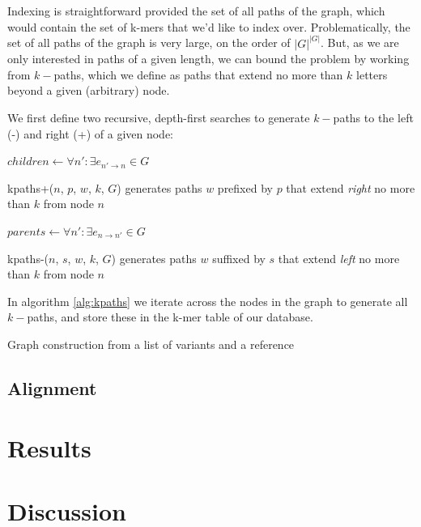 \documentclass{article}
\begin{document}
Indexing is straightforward provided the set of all paths of the graph, which would contain the set of k-mers that we'd like to index over. Problematically, the set of all paths of the graph is very large, on the order of $|G|^{|G|}$. But, as we are only interested in paths of a given length, we can bound the problem by working from $k-$paths, which we define as paths that extend no more than $k$ letters beyond a given (arbitrary) node.

We first define two recursive, depth-first searches to generate $k-$paths to the left (-) and right (+) of a given node:

\begin{function}[h!]
  \label{func:kpaths+}
  $children \gets \forall n' : \exists e_{n' \rightarrow n} \in G$ \\
  \caption{kpaths+($n$, $p$, $w$, $k$, $G$) generates paths $w$ prefixed by $p$ that extend \emph{right} no more than $k$ from node $n$ }
\end{function}

\begin{function}[h!]
  \label{func:kpaths-}
  $parents \gets \forall n' : \exists e_{n \rightarrow n'} \in G$ \\
  \caption{kpaths-($n$, $s$, $w$, $k$, $G$) generates paths $w$ suffixed by $s$ that extend \emph{left} no more than $k$ from node $n$ }
\end{function}

In algorithm \ref{alg:kpaths} we iterate across the nodes in the graph to generate all $k-$paths, and store these in the k-mer table of our database.

\begin{algorithm}[h!]
  
  \caption{
\label{alg:kpaths}
Graph construction from a list of variants and a reference}
\end{algorithm}

\subsection{Alignment}


\section{Results}


\section{Discussion}

\pagebreak

{}


\end{document}
